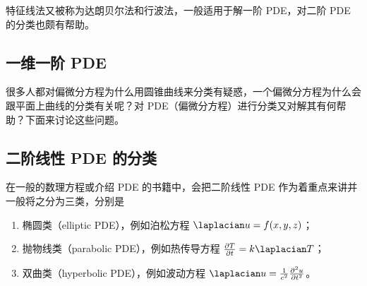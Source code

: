 
\begin{issues}
\issueMissDepend
\issueTODO
\issueDraft
\end{issues}

特征线法又被称为达朗贝尔法和行波法，一般适用于解一阶 PDE，对二阶 PDE 的分类也颇有帮助。

\subsection{一维一阶 PDE}

很多人都对偏微分方程为什么用圆锥曲线来分类有疑惑，一个偏微分方程为什么会跟平面上曲线的分类有关呢？对 PDE（偏微分方程）进行分类又对解其有何帮助？下面来讨论这些问题。

\subsection{二阶线性 PDE 的分类}
在一般的数理方程或介绍 PDE 的书籍中，会把二阶线性 PDE 作为着重点来讲并一般将之分为三类，分别是
\begin{enumerate}
\item 椭圆类（elliptic PDE），例如泊松方程 $\laplacian u = f(x,y,z)$；
\item 抛物线类（parabolic PDE），例如热传导方程 $\frac{\partial T}{\partial t} = k \laplacian T$；
\item 双曲类（hyperbolic PDE），例如波动方程 $\laplacian u = \frac{1}{c^2} \frac{\partial^2 u}{\partial t^2}$。
\end{enumerate}
